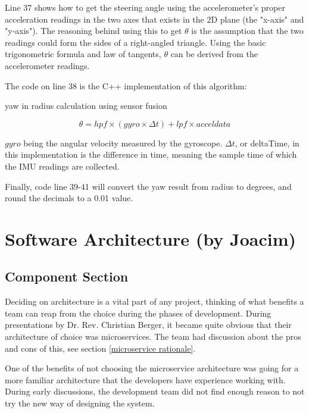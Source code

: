 \documentclass[12pt]{article}
\begin{document}
Line 37 shows how to get the steering angle using the accelerometer's proper acceleration readings in the two axes that exists in the 2D plane (the "x-axis" and "y-axis"). The reasoning behind using this to get $\theta$  is the assumption that the two readings could form the sides of a right-angled triangle. Using the basic trigonometric formula\cite{trigonometry} and law of tangents, $\theta$ can be derived from the accelerometer readings. 

The code on line 38 is the C++ implementation of this algorithm:
\begin{algorithm}                 
\caption{yaw in radius calculation using sensor fusion}    
		\[\theta = hpf\times(gyro\times \Delta t) + lpf\times acceldata\]
\end{algorithm}

$gyro$ being the angular velocity measured by the gyroscope. $\Delta t$, or deltaTime, in this implementation is the difference in time, meaning the sample time of which the IMU readings are collected.

Finally, code line 39-41 will convert the yaw result from radius to degrees, and round the decimals to a 0.01 value.  
\pagebreak

\section{Software Architecture (by Joacim)}\label{software architecture}

\subsection{Component Section}
Deciding on architecture is a vital part of any project, thinking of what benefits a team can reap from the choice during the phases of development. During presentations by Dr. Rev. Christian Berger, it became quite obvious that their architecture of choice was microservices. The team had discussion about the pros and cons of this, see section \ref{microservice rationale}. 

One of the benefits of not choosing the microservice architecture was going for a more familiar architecture that the developers have experience working with. During early discussions, the development team did not find enough reason to not try the new way of designing the system.
\end{document}
